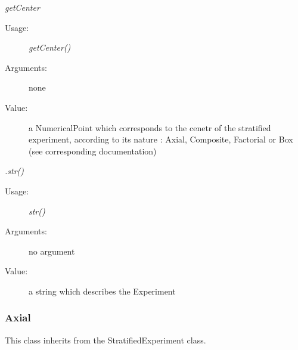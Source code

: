 \begin{description}
\begin{description}
\item \textit{getCenter}
\begin{description}
\item[Usage:] \textit{getCenter()}
\item[Arguments:] none
\item[Value:] a NumericalPoint which corresponds to the cenetr of the stratified experiment, according to its nature : Axial, Composite, Factorial or Box (see corresponding documentation)
\end{description}
\bigskip

\item \textit{.str()}
\begin{description}
\item[Usage:] \textit{str()}
\item[Arguments:] no argument
\item[Value:] a string which describes the Experiment
\end{description}

\end{description}

\end{description}


\newpage
\subsubsection{Axial}

This class inherits from the StratifiedExperiment class.\\

